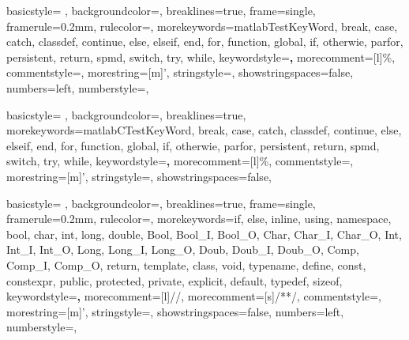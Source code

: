 {
    basicstyle= \ttfamily{}, %
    backgroundcolor=\color{background}, %
    breaklines=true, %
    frame=single,
    framerule=0.2mm, %
    rulecolor=\color{gray}, %
    morekeywords={matlabTestKeyWord, break, case, catch, classdef, continue, else, elseif, end, for, function, global, if, otherwie, parfor, persistent, return, spmd, switch, try, while},
    keywordstyle=\color{blue}\textbf,
    morecomment=[l]{\%},
    commentstyle=\color{comment},
    morestring=[m]',
    stringstyle=\color{string},
    showstringspaces=false,
    numbers=left,
    numberstyle={\ttfamily{}\color{gray}}, %
}

{
    basicstyle= \ttfamily{}, %
    backgroundcolor=\color{background}, %
    breaklines=true, %
    morekeywords={matlabCTestKeyWord, break, case, catch, classdef, continue, else, elseif, end, for, function, global, if, otherwie, parfor, persistent, return, spmd, switch, try, while},
    keywordstyle=\color{blue}\textbf,
    morecomment=[l]{\%},
    commentstyle=\color{comment},
    morestring=[m]',
    stringstyle=\color{string},
    showstringspaces=false,
}

{
    basicstyle= \ttfamily{}, %
    backgroundcolor=\color{background}, %
    breaklines=true, %
    frame=single,
    framerule=0.2mm, %
    rulecolor=\color{gray}, %
    morekeywords={if, else, inline, using, namespace, bool, char, int, long, double, Bool, Bool_I, Bool_O, Char, Char_I, Char_O, Int, Int_I, Int_O, Long, Long_I, Long_O, Doub, Doub_I, Doub_O, Comp, Comp_I, Comp_O, return, template, class, void, typename, define, const, constexpr, public, protected, private, explicit, default, typedef, sizeof},
    keywordstyle=\color{blue}\textbf,
    morecomment=[l]{//},
    morecomment=[s]{/*}{*/},
    commentstyle=\color{comment},
    morestring=[m]',
    stringstyle=\color{string},
    showstringspaces=false,
    numbers=left,
    numberstyle={\ttfamily{}\color{gray}}, %
}
